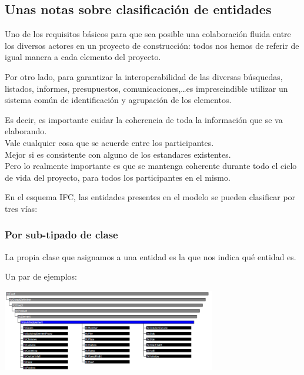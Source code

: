 \documentclass[spanish,10pt,a4paper,final,oneside]{article}
\begin{document}
\subsection{Unas notas sobre clasificación de entidades}
Uno de los requisitos básicos para que sea posible una colaboración fluida entre los diversos actores en un proyecto de construcción: todos nos hemos de referir de igual manera a cada elemento del proyecto.

Por otro lado, para garantizar la interoperabilidad de las diversas búsquedas, listados, informes, presupuestos, comunicaciones,\ldots es imprescindible utilizar un sistema común de identificación y agrupación de los elementos.

Es decir, es importante cuidar la coherencia de toda la información que se va elaborando.
\\Vale cualquier cosa que se acuerde entre los participantes.
\\Mejor si es consistente con alguno de los  estandares existentes.
\\Pero lo realmente importante es que se mantenga coherente durante todo el ciclo de vida del proyecto, para todos los participantes en el mismo. 

\vspace{0.5cm}
En el esquema IFC, las entidades presentes en el modelo se pueden clasificar por tres vías:

\subsubsection{Por sub-tipado de clase}
La propia clase que asignamos a una entidad es la que nos indica qué entidad es. 

Un par de ejemplos:

\includegraphics[width=0.7\textwidth]{ifcbuildingelement}
\end{document}
